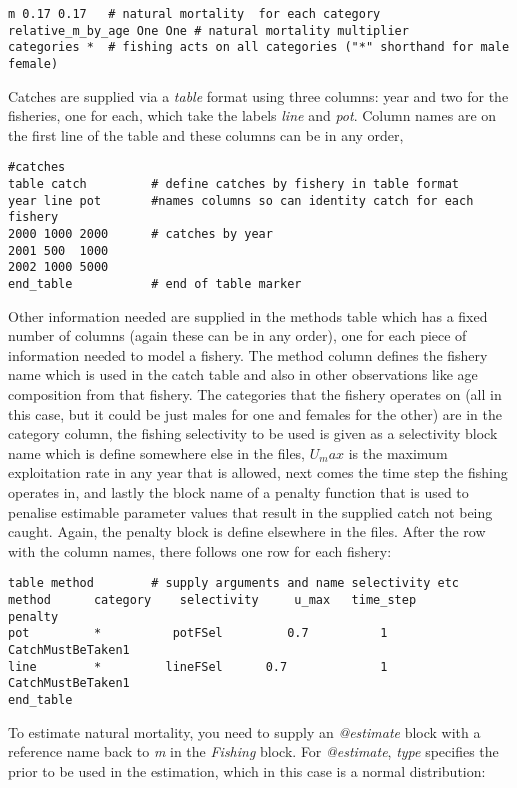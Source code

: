 {\small{\begin{verbatim}
m 0.17 0.17   # natural mortality  for each category
relative_m_by_age One One # natural mortality multiplier
categories *  # fishing acts on all categories ("*" shorthand for male female)
\end{verbatim}}}

Catches are supplied via a \textit{table} format using three columns: year and two for the fisheries, one for each, which take the labels \textit{line} and \textit{pot}. Column names are on the first line of the table and these columns can be in any order,

{\small{\begin{verbatim}
#catches
table catch         # define catches by fishery in table format
year line pot       #names columns so can identity catch for each fishery
2000 1000 2000      # catches by year
2001 500  1000
2002 1000 5000
end_table           # end of table marker
\end{verbatim}}}

Other information needed are supplied in the methods table which has a fixed number of columns (again these can be in any order), one for each piece of information needed to model a fishery. The method column defines the fishery name which is used in the catch table and also in other observations like age composition from that fishery. The categories that the fishery operates on (all in this case, but it could be just males for one and females for the other) are in the category column, the fishing selectivity to be used is given as a selectivity block name which is define somewhere else in the files, $U_max$ is the maximum exploitation rate in any year that is allowed, next comes the time step the fishing operates in, and lastly the block name of a penalty function that is used to penalise estimable parameter values that result in the supplied catch not being caught. Again, the penalty block is define elsewhere in the files. After the row with the column names, there follows one row for each fishery:

{\small{\begin{verbatim}
table method        # supply arguments and name selectivity etc
method  	category 	selectivity 	u_max 	time_step 		penalty
pot        	*  	       potFSel		   0.7 			1 	CatchMustBeTaken1
line     	*  	      lineFSel 	    0.7 			1 	CatchMustBeTaken1
end_table
\end{verbatim}}}

To estimate natural mortality, you need to supply an \textit{@estimate} block with a reference name back to \textit{m} in the \textit{Fishing} block. For \textit{@estimate}, \textit{type} specifies the prior to be used in the estimation, which in this case is a normal distribution:

